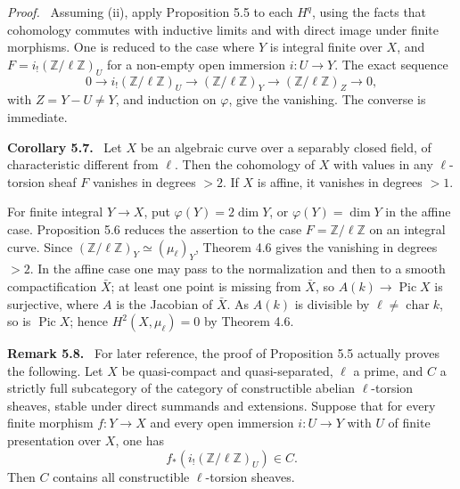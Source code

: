 \documentclass[11pt]{article}
\newcommand{\Zz}{\mathbb{Z}}
\newenvironment{statement}[1]{\par\medskip\noindent\textbf{#1.}\ }{\par\medskip}
\newenvironment{remarktext}[1]{\par\medskip\noindent\textbf{#1.}\ }{\par\medskip}
\newenvironment{prooftext}{\par\noindent\emph{Proof.}\ }{\par\medskip}
\DeclareMathOperator{\Pic}{Pic}
\begin{document}
\begin{prooftext}
Assuming (ii), apply Proposition 5.5 to each \(H^q\), using the facts that cohomology commutes with inductive limits and with direct image under finite morphisms. One is reduced to the case where \(Y\) is integral finite over \(X\), and \(F=i_!(\Zz/\ell\Zz)_U\) for a non-empty open immersion \(i:U\to Y\). The exact sequence
\[
0\longrightarrow i_!(\Zz/\ell\Zz)_U\longrightarrow (\Zz/\ell\Zz)_Y\longrightarrow (\Zz/\ell\Zz)_Z\longrightarrow0,
\]
with \(Z=Y-U\ne Y\), and induction on \(\varphi\), give the vanishing. The converse is immediate.
\end{prooftext}

\begin{statement}{Corollary 5.7}
Let \(X\) be an algebraic curve over a separably closed field, of characteristic different from \(\ell\). Then the cohomology of \(X\) with values in any \(\ell\)-torsion sheaf \(F\) vanishes in degrees \(>2\). If \(X\) is affine, it vanishes in degrees \(>1\).
\end{statement}

For finite integral \(Y\to X\), put \(\varphi(Y)=2\dim Y\), or \(\varphi(Y)=\dim Y\) in the affine case. Proposition 5.6 reduces the assertion to the case \(F=\Zz/\ell\Zz\) on an integral curve. Since \((\Zz/\ell\Zz)_Y\simeq(\mu_\ell)_Y\), Theorem 4.6 gives the vanishing in degrees \(>2\). In the affine case one may pass to the normalization and then to a smooth compactification \(\bar X\); at least one point is missing from \(\bar X\), so \(A(k)\to\Pic X\) is surjective, where \(A\) is the Jacobian of \(\bar X\). As \(A(k)\) is divisible by \(\ell\ne\operatorname{char}k\), so is \(\Pic X\); hence \(H^2(X,\mu_\ell)=0\) by Theorem 4.6.

\begin{remarktext}{Remark 5.8}
For later reference, the proof of Proposition 5.5 actually proves the following. Let \(X\) be quasi-compact and quasi-separated, \(\ell\) a prime, and \(C\) a strictly full subcategory of the category of constructible abelian \(\ell\)-torsion sheaves, stable under direct summands and extensions. Suppose that for every finite morphism \(f:Y\to X\) and every open immersion \(i:U\to Y\) with \(U\) of finite presentation over \(X\), one has
\[
f_*(i_!(\Zz/\ell\Zz)_U)\in C.
\]
Then \(C\) contains all constructible \(\ell\)-torsion sheaves.
\end{remarktext}
\end{document}
